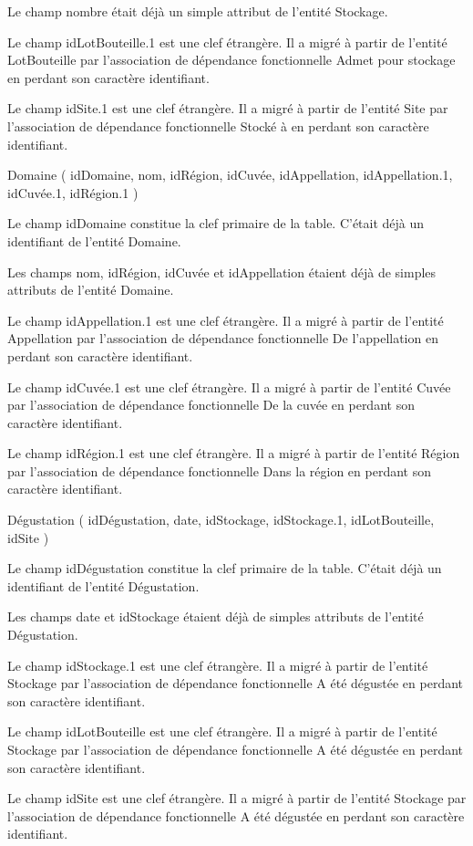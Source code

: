 \documentclass[11pt]{article}
\begin{document}
Le champ nombre était déjà un simple attribut de l'entité Stockage.

Le champ idLotBouteille.1 est une clef étrangère. Il a migré à partir de
l'entité LotBouteille par l'association de dépendance fonctionnelle
Admet pour stockage en perdant son caractère identifiant.

Le champ idSite.1 est une clef étrangère. Il a migré à partir de
l'entité Site par l'association de dépendance fonctionnelle Stocké à en
perdant son caractère identifiant.

{Domaine} ( {idDomaine}, {nom}, {idRégion}, {idCuvée}, {idAppellation},
{idAppellation.1}, {idCuvée.1}, {idRégion.1} )

Le champ idDomaine constitue la clef primaire de la table. C'était déjà
un identifiant de l'entité Domaine.

Les champs nom, idRégion, idCuvée et idAppellation étaient déjà de
simples attributs de l'entité Domaine.

Le champ idAppellation.1 est une clef étrangère. Il a migré à partir de
l'entité Appellation par l'association de dépendance fonctionnelle De
l'appellation en perdant son caractère identifiant.

Le champ idCuvée.1 est une clef étrangère. Il a migré à partir de
l'entité Cuvée par l'association de dépendance fonctionnelle De la cuvée
en perdant son caractère identifiant.

Le champ idRégion.1 est une clef étrangère. Il a migré à partir de
l'entité Région par l'association de dépendance fonctionnelle Dans la
région en perdant son caractère identifiant.

{Dégustation} ( {idDégustation}, {date}, {idStockage}, {idStockage.1},
{idLotBouteille}, {idSite} )

Le champ idDégustation constitue la clef primaire de la table. C'était
déjà un identifiant de l'entité Dégustation.

Les champs date et idStockage étaient déjà de simples attributs de
l'entité Dégustation.

Le champ idStockage.1 est une clef étrangère. Il a migré à partir de
l'entité Stockage par l'association de dépendance fonctionnelle A été
dégustée en perdant son caractère identifiant.

Le champ idLotBouteille est une clef étrangère. Il a migré à partir de
l'entité Stockage par l'association de dépendance fonctionnelle A été
dégustée en perdant son caractère identifiant.

Le champ idSite est une clef étrangère. Il a migré à partir de l'entité
Stockage par l'association de dépendance fonctionnelle A été dégustée en
perdant son caractère identifiant.
\end{document}
